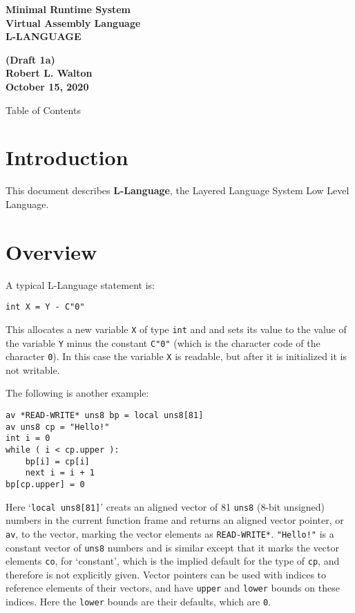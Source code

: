 \documentclass[12pt]{article}
\makeatletter
\renewcommand\tableofcontents{%
    \begin{list}{}%
	     {\setlength{\itemsep}{0in}%
	      \setlength{\topsep}{0in}%
	      \setlength{\parsep}{1ex}%
	      \setlength{\labelwidth}{0in}%
	      \setlength{\baselineskip}{1.5ex}%
	      \setlength{\leftmargin}{0.8in}%
	      \setlength{\rightmargin}{0.8in}}%
    \item\@starttoc{toc}%
    \end{list}}
\newcommand{\key}[1]{{\rm \bfseries #1}}
\newenvironment{indpar}[1][0.3in]%
	{\begin{list}{}%
		     {\setlength{\itemsep}{0in}%
		      \setlength{\topsep}{0in}%
		      \setlength{\parsep}{1ex}%
		      \setlength{\labelwidth}{#1}%
		      \setlength{\leftmargin}{#1}%
		      \addtolength{\leftmargin}{\labelsep}}%
	 \item}%
	{\end{list}}
\makeatother
\begin{document}
        
\begin{center}
\Large \bf
Minimal Runtime System\\
Virtual Assembly Language\\[0.5ex]
\huge \bf
L-LANGUAGE
\end{center}
\begin{center}
\large \bf
(Draft 1a)
\\[0.5ex]
Robert L. Walton\\
October 15, 2020

\bigskip
 
Table of Contents
\end{center}

\bigskip

\tableofcontents 

\newpage

\section{Introduction}

This document describes \key{L-Language}, the Layered Language
System Low Level Language.

\section{Overview}

A typical L-Language statement is:
\begin{indpar}\begin{verbatim}
int X = Y - C"0"
\end{verbatim}\end{indpar}
This allocates a new variable {\tt X} of type {\tt int} and
and sets its value to the value of the
variable {\tt Y} minus the constant {\tt C"0"} (which is
the character code of the character {\tt 0}).
In this case the variable {\tt X} is readable, but after it is
initialized it is not writable.

The following is another example:
\begin{indpar}\begin{verbatim}
av *READ-WRITE* uns8 bp = local uns8[81]
av uns8 cp = "Hello!"
int i = 0
while ( i < cp.upper ):
    bp[i] = cp[i]
    next i = i + 1
bp[cp.upper] = 0
\end{verbatim}\end{indpar}

Here `{\tt local uns8[81]}' creats an aligned vector of
81 {\tt uns8} (8-bit unsigned) numbers in the current function
frame and returns an aligned vector pointer, or {\tt av}, to
the vector, marking the vector elements as {\tt *READ-WRITE*}.
{\tt "Hello!"} is a constant vector of {\tt uns8} numbers
and is similar except that it marks the vector elements
{\tt co}, for `constant', which is the implied default for the type
of {\tt cp}, and therefore
is not explicitly given.
Vector pointers can be used with indices
to reference elements of their vectors, and have {\tt upper} and
{\tt lower} bounds on these indices.  Here the {\tt lower} bounds
are their defaults, which are {\tt 0}.
\end{document}
